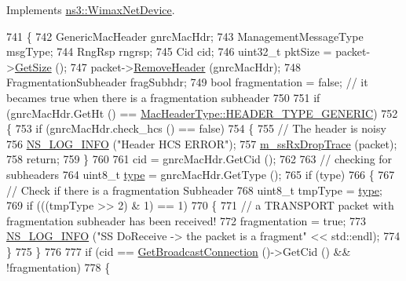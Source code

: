 Implements \hyperlink{classns3_1_1WimaxNetDevice_a9c27ed8c265ca1516ee289c6a02a75fa}{ns3\+::\+Wimax\+Net\+Device}.


\begin{DoxyCode}
741 \{
742   GenericMacHeader gnrcMacHdr;
743   ManagementMessageType msgType;
744   RngRsp rngrsp;
745   Cid cid;
746   uint32\_t pktSize = packet->\hyperlink{classns3_1_1Packet_a462855c9929954d4301a4edfe55f4f1c}{GetSize} ();
747   packet->\hyperlink{classns3_1_1Packet_a0961eccf975d75f902d40956c93ba63e}{RemoveHeader} (gnrcMacHdr);
748   FragmentationSubheader fragSubhdr;
749   \textcolor{keywordtype}{bool} fragmentation = \textcolor{keyword}{false};  \textcolor{comment}{// it becames true when there is a fragmentation subheader}
750 
751   \textcolor{keywordflow}{if} (gnrcMacHdr.GetHt () == \hyperlink{classns3_1_1MacHeaderType_a54d8fc8bc93a2b7865627965cdd31c20a48fe5b2f20cadf78008c71469b518403}{MacHeaderType::HEADER\_TYPE\_GENERIC})
752     \{
753       \textcolor{keywordflow}{if} (gnrcMacHdr.check\_hcs () == \textcolor{keyword}{false})
754         \{
755           \textcolor{comment}{// The header is noisy}
756           \hyperlink{group__logging_gafbd73ee2cf9f26b319f49086d8e860fb}{NS\_LOG\_INFO} (\textcolor{stringliteral}{"Header HCS ERROR"});
757           \hyperlink{classns3_1_1SubscriberStationNetDevice_aa8ecbe05da5dcc544b94a2965cabdb9f}{m\_ssRxDropTrace} (packet);
758           \textcolor{keywordflow}{return};
759         \}
760 
761       cid = gnrcMacHdr.GetCid ();
762 
763       \textcolor{comment}{// checking for subheaders}
764       uint8\_t \hyperlink{visualizer-ideas_8txt_add98db9e15e2a58cf2b57623e7aa893a}{type} = gnrcMacHdr.GetType ();
765       \textcolor{keywordflow}{if} (type)
766         \{
767           \textcolor{comment}{// Check if there is a fragmentation Subheader}
768           uint8\_t tmpType = \hyperlink{visualizer-ideas_8txt_add98db9e15e2a58cf2b57623e7aa893a}{type};
769           \textcolor{keywordflow}{if} (((tmpType >> 2) & 1) == 1)
770             \{
771               \textcolor{comment}{// a TRANSPORT packet with fragmentation subheader has been received!}
772               fragmentation = \textcolor{keyword}{true};
773               \hyperlink{group__logging_gafbd73ee2cf9f26b319f49086d8e860fb}{NS\_LOG\_INFO} (\textcolor{stringliteral}{"SS DoReceive -> the packet is a fragment"} <<  std::endl);
774             \}
775         \}
776 
777       \textcolor{keywordflow}{if} (cid == \hyperlink{classns3_1_1WimaxNetDevice_a11d2c7bbd695e2c845a821ec15baa2aa}{GetBroadcastConnection} ()->GetCid () && !fragmentation)
778         \{

\end{DoxyCode}
